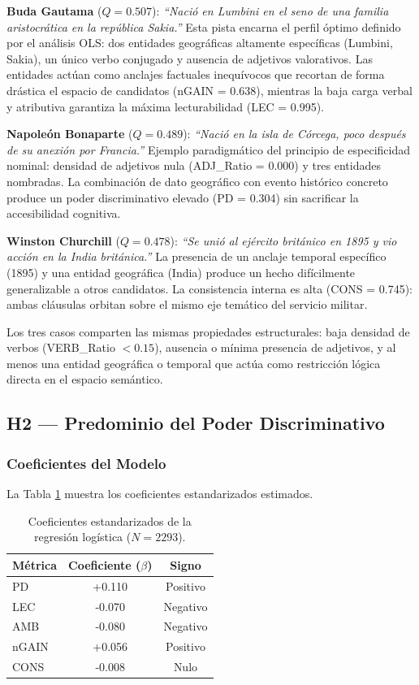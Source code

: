 \documentclass[../main.tex]{subfiles}
\begin{document}
\textbf{Buda Gautama} ($Q = 0.507$): \textit{``Nació en Lumbini en el seno de una familia aristocrática en la república Sakia.''} Esta pista encarna el perfil óptimo definido por el análisis OLS: dos entidades geográficas altamente específicas (Lumbini, Sakia), un único verbo conjugado y ausencia de adjetivos valorativos. Las entidades actúan como anclajes factuales inequívocos que recortan de forma drástica el espacio de candidatos (nGAIN = 0.638), mientras la baja carga verbal y atributiva garantiza la máxima lecturabilidad (LEC = 0.995).

\textbf{Napoleón Bonaparte} ($Q = 0.489$): \textit{``Nació en la isla de Córcega, poco después de su anexión por Francia.''} Ejemplo paradigmático del principio de especificidad nominal: densidad de adjetivos nula (ADJ\_Ratio = 0.000) y tres entidades nombradas. La combinación de dato geográfico con evento histórico concreto produce un poder discriminativo elevado (PD = 0.304) sin sacrificar la accesibilidad cognitiva.

\textbf{Winston Churchill} ($Q = 0.478$): \textit{``Se unió al ejército británico en 1895 y vio acción en la India británica.''} La presencia de un anclaje temporal específico (1895) y una entidad geográfica (India) produce un hecho difícilmente generalizable a otros candidatos. La consistencia interna es alta (CONS = 0.745): ambas cláusulas orbitan sobre el mismo eje temático del servicio militar.

Los tres casos comparten las mismas propiedades estructurales: baja densidad de verbos (VERB\_Ratio $< 0.15$), ausencia o mínima presencia de adjetivos, y al menos una entidad geográfica o temporal que actúa como restricción lógica directa en el espacio semántico.

\subsection{H2 --- Predominio del Poder Discriminativo}

\subsubsection{Coeficientes del Modelo}

La Tabla \ref{tab:coeficientes_logistica} muestra los coeficientes estandarizados estimados.

\begin{table}[H]
\centering
\begin{tabular}{|l|c|c|}
\hline
\textbf{Métrica} & \textbf{Coeficiente ($\beta$)} & \textbf{Signo} \\ \hline
PD & +0.110 & Positivo \\
LEC & -0.070 & Negativo \\
AMB & -0.080 & Negativo \\
nGAIN & +0.056 & Positivo \\
CONS & -0.008 & Nulo \\
\hline
\end{tabular}
\caption{Coeficientes estandarizados de la regresión logística ($N=2293$).}
\label{tab:coeficientes_logistica}
\end{table}
\end{document}
